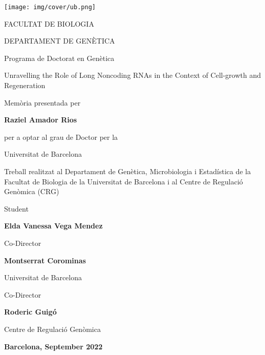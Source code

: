 \begin{titlepage}

\begin{center}
\texttt{[image: img/cover/ub.png]}
  
\vspace*{1ex}
FACULTAT DE BIOLOGIA

DEPARTAMENT DE GENÈTICA

Programa de Doctorat en Genètica

\vspace*{2ex}

{\huge\mdseries Unravelling the Role of Long Noncoding RNAs in the Context of Cell-growth and Regeneration\par}
\vspace*{2ex}

Memòria presentada per    

\textbf{Raziel Amador Rios}

per a optar al grau de Doctor per la

Universitat de Barcelona

\vspace*{3ex}
Treball realitzat al Departament de Genètica, Microbiologia i Estadística de la Facultat de Biologia de la Universitat de Barcelona i al Centre de Regulació Genòmica (CRG)

\vfill
\begin{minipage}[b]{1\linewidth}\centering
Student
  
\textbf{Elda Vanessa Vega Mendez}
\end{minipage}
\end{center}

\vspace*{5ex}
\begin{minipage}[b]{0.45\linewidth}\centering
Co-Director
  
\textbf{Montserrat Corominas}

Universitat de Barcelona
\end{minipage}
\hfill
\begin{minipage}[b]{0.45\linewidth}\centering

Co-Director

\textbf{Roderic Guigó}

Centre de Regulació Genòmica
\end{minipage}
\vspace*{2ex}

\begin{center}
\textbf{Barcelona, September 2022}
\end{center}

\end{titlepage}


